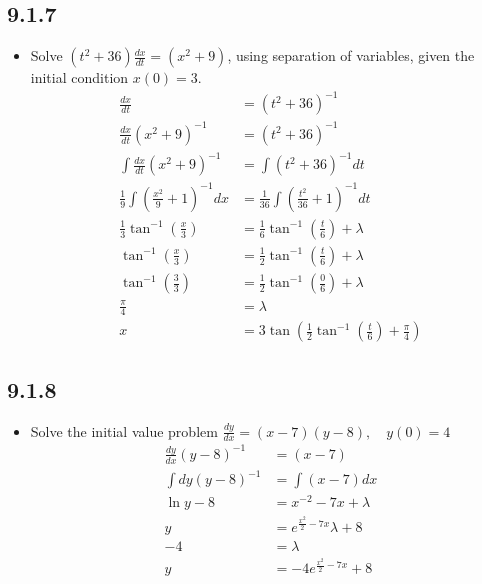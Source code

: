\begin{itemize}
  \subsection{9.1.7}
  \begin{itemize}
    \item Solve \( (t^2 + 36)\frac{dx}{dt} = (x^2+9) \), using separation of
      variables, given the initial condition \( x(0)=3 \).
      \begin{align*}
        \frac{dx}{dt} &= \left( t^2+36 \right)^{-1} \\
        \frac{dx}{dt} \left( x^2 + 9 \right)^{-1} &= (t^2 + 36)^{-1} \\
        \int\frac{dx}{dt} \left( x^2 + 9 \right)^{-1} &= \int (t^2 + 36)^{-1}dt \\
        \frac{1}{9}\int \left(\frac{x^2}{9}+1\right)^{-1}dx &= \frac{1}{36} \int \left(\frac{t^2}{36} + 1\right)^{-1} dt \\
        \frac{1}{3}\tan ^{-1}\left( \frac{x}{3} \right) &= \frac{1}{6} \tan ^{-1} \left( \frac{t}{6} \right) + \lambda \\
        \tan ^{-1} \left( \frac{x}{3} \right) &= \frac{1}{2}\tan ^{-1}\left( \frac{t}{6} \right) + \lambda \\
        \tan ^{-1} \left( \frac{3}{3} \right) &= \frac{1}{2}\tan ^{-1}\left( \frac{0}{6} \right) + \lambda \\
        \frac{\pi}{4} &= \lambda \\
        x &= 3\tan \left( \frac{1}{2}\tan ^{-1}\left( \frac{t}{6} \right) + \frac{\pi}{4} \right)
      \end{align*}
  \end{itemize}

  \subsection{9.1.8}
  \begin{itemize}
    \item Solve the initial value problem \( \frac{dy}{dx} = \left( x-7 \right) (y-8), \quad y\left( 0 \right) = 4 \)
      \begin{align*}
        \frac{dy}{dx} \left( y-8 \right) ^{-1} &= \left( x-7 \right) \\
        \int dy \left( y-8 \right) ^{-1} &= \int \left( x-7 \right) dx\\
        \ln y-8 &= x^{-2} -7x + \lambda \\
        y &= e^{\frac{x^2}{2}-7x}\lambda + 8 \\
        -4 &= \lambda \\
        y &= -4e^{\frac{x^2}{2}-7x} + 8
      \end{align*}
  \end{itemize}


\end{itemize}
